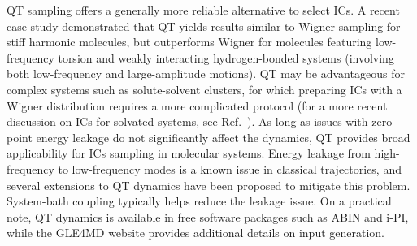 \documentclass[9pt,bestpractices]{livecoms}
\begin{document}
QT sampling offers a generally more reliable alternative to select ICs. A recent case study\cite{prlj2023deciphering}  demonstrated that QT yields results similar to Wigner sampling for stiff harmonic molecules, but outperforms Wigner for molecules featuring low-frequency torsion and weakly interacting hydrogen-bonded systems (involving both low-frequency and large-amplitude motions). QT may be advantageous for complex systems such as solute-solvent clusters, for which preparing ICs with a Wigner distribution requires a more complicated protocol \cite{ruckenbauer2010azomethane} (for a more recent discussion on ICs for solvated systems, see Ref.~). As long as issues with zero-point energy leakage do not significantly affect the dynamics, QT provides broad applicability for ICs sampling in molecular systems. Energy leakage from high-frequency to low-frequency modes is a known issue in classical trajectories, and several extensions to QT dynamics have been proposed to mitigate this problem. System-bath coupling typically helps reduce the leakage issue.\cite{Brieuc2016, Mangaud2019} On a practical note, QT dynamics is available in free software packages such as ABIN\cite{abin} and i-PI\cite{kapil2019pi}, while the GLE4MD website\cite{GLE4MDwebsite} provides additional details on input generation.
\end{document}
